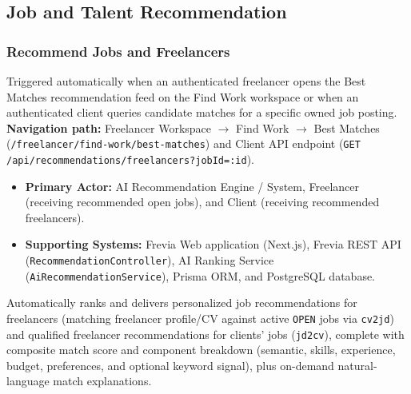 
\subsection{Job and Talent Recommendation}

\subsubsection{Recommend Jobs and Freelancers}

Triggered automatically when an authenticated freelancer opens the Best Matches recommendation feed on the Find Work workspace or when an authenticated client queries candidate matches for a specific owned job posting.\newline
\textbf{Navigation path:} Freelancer Workspace $\rightarrow$ Find Work $\rightarrow$ Best Matches (\texttt{/\allowbreak{}freelancer/\allowbreak{}find-\allowbreak{}work/\allowbreak{}best-\allowbreak{}matches}) and Client API endpoint (\texttt{GET /\allowbreak{}api/\allowbreak{}recommendations/\allowbreak{}freelancers?\allowbreak{}jobId=\allowbreak{}:id}).


\begin{itemize}[leftmargin=1.6em,topsep=3pt,itemsep=2pt,parsep=0pt,label=$\bullet$]
    \item \textbf{Primary Actor:} AI Recommendation Engine / System, Freelancer (receiving recommended open jobs), and Client (receiving recommended freelancers).
    \item \textbf{Supporting Systems:} Frevia Web application (Next.js), Frevia REST API (\texttt{RecommendationController}), AI Ranking Service (\texttt{AiRecommendationService}), Prisma ORM, and PostgreSQL database.
\end{itemize}

\noindent Automatically ranks and delivers personalized job recommendations for freelancers (matching freelancer profile/CV against active \texttt{OPEN} jobs via \texttt{cv2jd}) and qualified freelancer recommendations for clients' jobs (\texttt{jd2cv}), complete with composite match score and component breakdown (semantic, skills, experience, budget, preferences, and optional keyword signal), plus on-demand natural-language match explanations.

